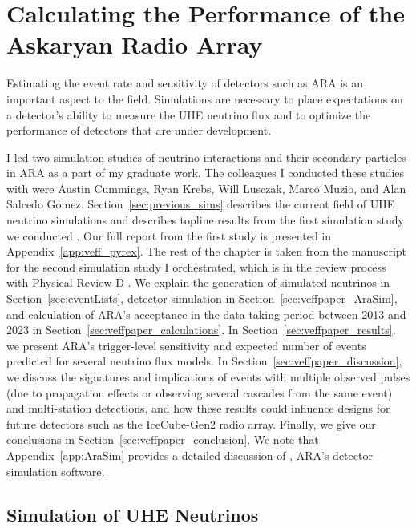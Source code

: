 \chapter{Calculating the Performance of the Askaryan Radio Array \label{chap:veff}}

  Estimating the event rate and sensitivity of detectors such as ARA is an important aspect to the field.
  Simulations are necessary to place expectations on a detector's ability to measure the UHE neutrino flux and to optimize the performance of detectors that are under development.

  I led two simulation studies of neutrino interactions and their secondary particles in ARA as a part of my graduate work.
  The colleagues I conducted these studies with were Austin Cummings, Ryan Krebs, Will Lusczak, Marco Muzio, and Alan Salcedo Gomez.
  Section~\ref{sec:previous_sims} describes the current field of UHE neutrino simulations and describes topline results from the first simulation study we conducted \citep{ara_secondaries}. 
  Our full report from the first study is presented in Appendix~\ref{app:veff_pyrex}.
  The rest of the chapter is taken from the manuscript for the second simulation study I orchestrated, which is in the review process with Physical Review D \citep{ara_veff}. 
  We explain the generation of simulated neutrinos in Section~\ref{sec:eventLists}, detector simulation in Section~\ref{sec:veffpaper_AraSim}, and calculation of ARA's acceptance in the data-taking period between 2013 and 2023 in Section~\ref{sec:veffpaper_calculations}.
  In Section~\ref{sec:veffpaper_results}, we present ARA's trigger-level sensitivity and expected number of events predicted for several neutrino flux models.
  In Section~\ref{sec:veffpaper_discussion}, we discuss the signatures and implications of events with multiple observed pulses (due to propagation effects or observing several cascades from the same event) and multi-station detections, and how these results could influence designs for future detectors such as the IceCube-Gen2 radio array.
  Finally, we give our conclusions in Section~\ref{sec:veffpaper_conclusion}.
  We note that Appendix~\ref{app:AraSim} provides a detailed discussion of \arasim{}, ARA's detector simulation software.

\section{Simulation of UHE Neutrinos \label{sec:previous_sims}}


